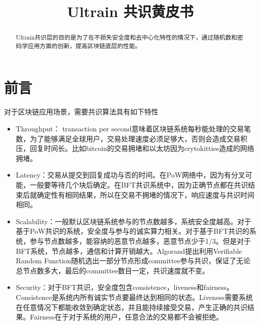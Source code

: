 \documentclass[12pt, UTF8]{article}
\title{Ultrain 共识黄皮书}
\begin{document}
\begin{titlepage}
\maketitle
\end{titlepage}

\tableofcontents
\newpage

\begin{abstract}
Ultrain共识层的目的是为了在不损失安全度和去中心化特性的情况下，通过随机数和密码学应用方面的创新，提高区块链底层的性能。
\end{abstract}

\section{前言}

对于区块链应用场景，需要共识算法具有如下特性
\begin{itemize}
\item Throughput： transaction per second意味着区块链系统每秒能处理的交易笔数，为了能够满足全球用户，交易处理速度必须足够大，否则会造成交易积压，回复时间长。比如bitcoin的交易拥堵和以太坊因为crytokitties造成的网络拥堵。
\item Latency：交易从提交到回复成功与否的时间。在PoW网络中，因为有分叉可能，一般要等待几个块后确定。在BFT共识系统中，因为正确节点都在共识结束后就确定性有相同结果，所以在交易不拥堵的情况下，响应速度与共识时间相同。
\item Scalability：一般默认区块链系统参与的节点数越多，系统安全度越高。对于基于PoW共识的系统，安全度与参与的诚实算力相关。对于基于BFT共识的系统，参与节点数越多，能容纳的恶意节点越多，恶意节点少于1/3。但是对于BFT系统，节点越多，通信和计算开销越大。Algorand提出利用Verifiable Random Function随机选出一部分节点形成committee参与共识，保证了无论总节点数多大，最后的committee数目一定，共识速度就不变。
\item Security：对于BFT共识，安全度包含consistence，liveness和fairness。Consistence是系统内所有诚实节点要最终达到相同的状态。Liveness需要系统在任意情况下都能收敛到确定状态，并且能持续接受交易，产生正确的共识结果。Fairness在于对于系统的用户，任意合法的交易都不会被拒绝。 
\end{itemize}
\end{document}
